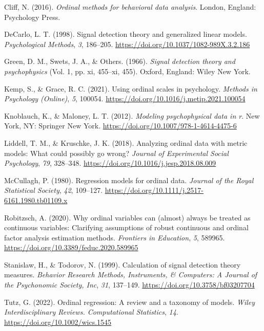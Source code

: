 \documentclass[
  man,floatsintext]{apa6}
\newlength{\cslhangindent}
\newenvironment{CSLReferences}[2] %
 {\begin{list}{}{%
  \setlength{\itemindent}{0pt}
  \setlength{\leftmargin}{0pt}
  \setlength{\parsep}{0pt}
  \ifodd #1
   \setlength{\leftmargin}{\cslhangindent}
   \setlength{\itemindent}{-1\cslhangindent}
  \fi
  \setlength{\itemsep}{#2\baselineskip}}}
 {\end{list}}
\begin{document}
\label{refs}
\begin{CSLReferences}{1}{0}
Cliff, N. (2016). \emph{Ordinal methods for behavioral data analysis}. London, England: Psychology Press.

DeCarlo, L. T. (1998). Signal detection theory and generalized linear models. \emph{Psychological Methods}, \emph{3}, 186--205. \url{https://doi.org/10.1037/1082-989X.3.2.186}

Green, D. M., Swets, J. A., \& Others. (1966). \emph{Signal detection theory and psychophysics} (Vol. 1, pp. xi, 455--xi, 455). Oxford, England: Wiley New York.

Kemp, S., \& Grace, R. C. (2021). Using ordinal scales in psychology. \emph{Methods in Psychology (Online)}, \emph{5}, 100054. \url{https://doi.org/10.1016/j.metip.2021.100054}

Knoblauch, K., \& Maloney, L. T. (2012). \emph{Modeling psychophysical data in r}. New York, NY: Springer New York. \url{https://doi.org/10.1007/978-1-4614-4475-6}

Liddell, T. M., \& Kruschke, J. K. (2018). Analyzing ordinal data with metric models: What could possibly go wrong? \emph{Journal of Experimental Social Psychology}, \emph{79}, 328--348. \url{https://doi.org/10.1016/j.jesp.2018.08.009}

McCullagh, P. (1980). Regression models for ordinal data. \emph{Journal of the Royal Statistical Society}, \emph{42}, 109--127. \url{https://doi.org/10.1111/j.2517-6161.1980.tb01109.x}

Robitzsch, A. (2020). Why ordinal variables can (almost) always be treated as continuous variables: Clarifying assumptions of robust continuous and ordinal factor analysis estimation methods. \emph{Frontiers in Education}, \emph{5}, 589965. \url{https://doi.org/10.3389/feduc.2020.589965}

Stanislaw, H., \& Todorov, N. (1999). Calculation of signal detection theory measures. \emph{Behavior Research Methods, Instruments, \& Computers: A Journal of the Psychonomic Society, Inc}, \emph{31}, 137--149. \url{https://doi.org/10.3758/bf03207704}

Tutz, G. (2022). Ordinal regression: A review and a taxonomy of models. \emph{Wiley Interdisciplinary Reviews. Computational Statistics}, \emph{14}. \url{https://doi.org/10.1002/wics.1545}

\end{CSLReferences}
\end{document}
